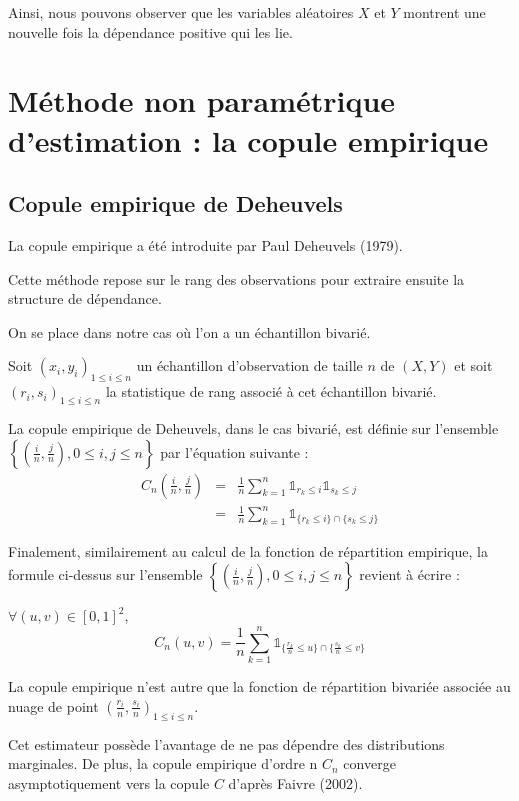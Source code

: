 Ainsi, nous pouvons observer que les variables aléatoires $X$ et $Y$ montrent une nouvelle fois la dépendance positive qui les lie.

\section{Méthode non paramétrique d'estimation : la copule empirique}

\subsection{Copule empirique de Deheuvels}

La copule empirique a été introduite par Paul Deheuvels (1979). 

Cette méthode repose sur le rang des observations pour extraire ensuite la
structure de dépendance.

On se place dans notre cas où l'on a un échantillon bivarié.

Soit $(x_i,y_i)_{1 \leq i \leq n}$ un échantillon d'observation de taille $n$ de $(X,Y)$ 
et soit $(r_i,s_i)_{1 \leq i \leq n}$ la statistique de rang associé à cet échantillon bivarié.

La copule empirique de Deheuvels, dans le cas bivarié, est définie sur l'ensemble $\left \{ \left( \frac{i}{n} , \frac{j}{n} \right) , 0 \leq i,j \leq n   \right \}$ 
par l'équation suivante :
\begin{eqnarray*}
C_n \left( \frac{i}{n},\frac{j}{n}\right) &=& \frac{1}{n} \sum_{k=1}^n \mathbb{1}_{r_k \leq i} \mathbb{1}_{s_k \leq j} \\
 &=& \frac{1}{n} \sum_{k=1}^n \mathbb{1}_{ \{r_k \leq i\} \cap \{ s_k \leq j\} } 
\end{eqnarray*}

Finalement, similairement au calcul de la fonction de répartition empirique, la formule ci-dessus sur l'ensemble $\left \{ \left( \frac{i}{n} , \frac{j}{n} \right) , 0 \leq i,j \leq n   \right \}$ revient à écrire :

$\forall (u,v) \in [0,1]^2$,
$$
C_n(u,v) = \frac{1}{n} \sum_{k=1}^n \mathbb{1}_{ \{ \frac{r_k}{n} \leq u\} \cap \{ \frac{s_k}{n} \leq v\} } 
$$

La copule empirique n’est autre que la fonction de répartition bivariée associée au nuage de point $\left( \frac{r_i}{n},\frac{s_i}{n} \right )_{1 \leq i \leq n}$.

Cet estimateur possède l'avantage de ne pas dépendre des distributions marginales. De plus, la copule
empirique d'ordre n $C_n$ converge asymptotiquement vers la copule $C$ d'après Faivre (2002).

